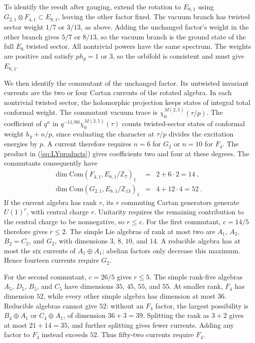 \documentclass[12pt]{article}
\numberwithin{equation}{section}
\newcommand{\bea}{\begin{eqnarray}}
\newcommand{\eea}{\end{eqnarray}}
\def\no{\nonumber}
\def\ZZ{\mathbb{Z}}
\theoremstyle{remark}
\begin{document}
To identify the result after gauging, extend the rotation to $E_{8,1}$ using $G_{2,1}\otimes F_{4,1}\subset E_{8,1}$, leaving the other factor fixed. The vacuum branch has twisted sector weight $1/7$ or $3/13$, as above. Adding the unchanged factor's weight in the other branch gives $5/7$ or $8/13$, so the vacuum branch is the ground state of the full $E_8$ twisted sector. All nontrivial powers have the same spectrum. The weights are positive and satisfy $ph_g=1$ or $3$, so the orbifold is consistent and must give $E_{8,1}$.

We then identify the commutant of the unchanged factor. Its untwisted invariant currents are the two or four Cartan currents of the rotated algebra. In each nontrivial twisted sector, the holomorphic projection keeps states of integral total conformal weight. The commutant vacuum trace is $\chi^{M(2,5)}_0(\tau/p)$. 
The coefficient of $q^n$ in $q^{-11/60}\chi^{M(2,5)}_0(\tau)$ counts twisted-sector states of conformal weight $h_g+n/p$, since evaluating the character at $\tau/p$ divides the excitation energies by $p$. A current therefore requires $n=6$ for $G_2$ or $n=10$ for $F_4$. The product in (\ref{eq:LYproducts}) gives coefficients two and four at these degrees. The commutants consequently have
\bea
\dim\mathrm{Com}(F_{4,1},E_{8,1}/\ZZ_7)_1&=&2+6\cdot2=14~,\no\\
\dim\mathrm{Com}(G_{2,1},E_{8,1}/\ZZ_{13})_1&=&4+12\cdot4=52~.
\eea
If the current algebra has rank $r$, its $r$ commuting Cartan generators generate $U(1)^r$, with central charge $r$. Unitarity requires the remaining contribution to the central charge to be nonnegative, so $r\leq c$. For the first commutant, $c=14/5$ therefore gives $r\leq2$. The simple Lie algebras of rank at most two are $A_1$, $A_2$, $B_2=C_2$, and $G_2$, with dimensions $3$, $8$, $10$, and $14$. A reducible algebra has at most the six currents of $A_1\oplus A_1$; abelian factors only decrease this maximum. Hence fourteen currents require $G_2$.

For the second commutant, $c=26/5$ gives $r\leq5$. The simple rank-five algebras $A_5$, $D_5$, $B_5$, and $C_5$ have dimensions $35$, $45$, $55$, and $55$. At smaller rank, $F_4$ has dimension $52$, while every other simple algebra has dimension at most $36$. Reducible algebras cannot give $52$: without an $F_4$ factor, the largest possibility is $B_4\oplus A_1$ or $C_4\oplus A_1$, of dimension $36+3=39$. Splitting the rank as $3+2$ gives at most $21+14=35$, and further splitting gives fewer currents. Adding any factor to $F_4$ instead exceeds $52$. Thus fifty-two currents require $F_4$.
\end{document}
